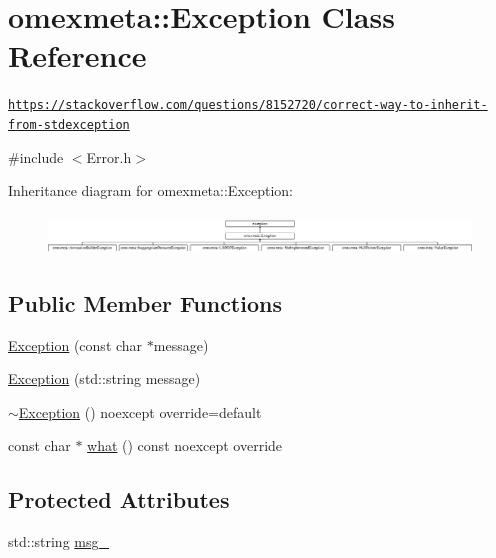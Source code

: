 \hypertarget{classomexmeta_1_1Exception}{}\section{omexmeta\+:\+:Exception Class Reference}
\label{classomexmeta_1_1Exception}


\href{https://stackoverflow.com/questions/8152720/correct-way-to-inherit-from-stdexception}{\tt https\+://stackoverflow.\+com/questions/8152720/correct-\/way-\/to-\/inherit-\/from-\/stdexception}  




{\ttfamily \#include $<$Error.\+h$>$}

Inheritance diagram for omexmeta\+:\+:Exception\+:\begin{figure}[H]
\begin{center}
\leavevmode
\includegraphics[height=1.056604cm]{classomexmeta_1_1Exception}
\end{center}
\end{figure}
\subsection*{Public Member Functions}
\begin{DoxyCompactItemize}
\item 
\hyperlink{classomexmeta_1_1Exception_ad09e2a190a245199974678e2790e81ff}{Exception} (const char $\ast$message)
\item 
\hyperlink{classomexmeta_1_1Exception_ac50b0a25504303cc1a4a1a20de0127eb}{Exception} (std\+::string message)
\item 
\hyperlink{classomexmeta_1_1Exception_aaa08b2467c40a3e28586c0da5da45736}{$\sim$\+Exception} () noexcept override=default
\item 
const char $\ast$ \hyperlink{classomexmeta_1_1Exception_af9c3f258e4715dd2102f5c2db5fbe260}{what} () const noexcept override
\end{DoxyCompactItemize}
\subsection*{Protected Attributes}
\begin{DoxyCompactItemize}
\item 
std\+::string \hyperlink{classomexmeta_1_1Exception_a99067aa4ed7e38cf27b986cca3734512}{msg\+\_\+}
\end{DoxyCompactItemize}


